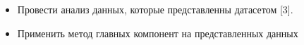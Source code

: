 \documentclass[../body.tex]{subfiles}
\begin{document}
	\begin{itemize}
		\item Провести анализ данных, которые представленны датасетом [3].
		\item Применить метод главных компонент на представленных данных
	\end{itemize}
 
\end{document}
